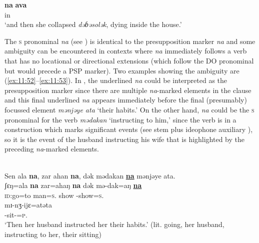       \medskip 
\gll \textbf{na}   \textbf{ava}\\
{\PSP}  in\\
\glt  ‘and then she collapsed \textit{dəɓəsolək}, dying inside the house.’
\z

The \textsc{s} \DO pronominal \textit{na} (see ) is identical to the presupposition marker \textit{na} and some ambiguity can be encountered in contexts where \textit{na} immediately follows a verb that has no locational or directional extensions (which follow the DO pronominal but would precede a PSP marker). Two examples showing the ambiguity are (\ref{ex:11:52}--\ref{ex:11:53}). In ,  the underlined \textit{na}  could be interpreted as the presupposition marker since there are multiple \textit{na}{}-marked elements in the clause and this final underlined \textit{na} appears immediately before the final (presumably) focussed element \textit{mənjəye ata} ‘their habits.’ On the other hand, \textit{na} could be  the \textsc{s} \DO pronominal for the verb \textit{mədakan} ‘instructing to him,’ since the verb is in a construction which marks significant events (see stem plus ideophone auxiliary ), so it is the event of the husband instructing his wife that is highlighted by the preceding \textit{na}-marked elements.

\ea \label{ex:11:52}
\\
Sen  ala  \textbf{na},  zar  ahan  \textbf{na},  dək  mədakan  \underline{\textbf{na}}  mənjəye  ata.\\
\gll  ʃɛŋ=ala       \textbf{na}  zar=ahaŋ     \textbf{na}  dək        mə-dak=aŋ    \underline{\textbf{na}}    \\     
      \textsc{id}:go=to   {\PSP}   man=\textsc{s}.{\POSS}  {\PSP}   show  {\NOM}-show=\textsc{s}.{\IO}  {\PSP}  \\ 
      
      \medskip 
\gll mɪ-nʒ-ijɛ=atəta \\
     {\NOM}{}-sit-{\CL}=\textsc{p}.{\POSS}\\
\glt  ‘Then her husband instructed her their habits.’ (lit. going, her husband, instructing to her, their sitting)
\z

